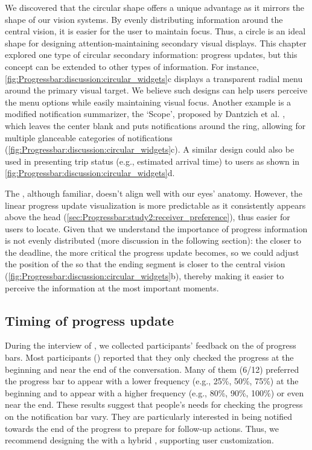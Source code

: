 We discovered that the circular shape offers a unique advantage as it mirrors the shape of our vision systems. By evenly distributing information around the central vision, it is easier for the user to maintain focus. Thus, a circle is an ideal shape for designing attention-maintaining secondary visual displays. This chapter explored one type of circular secondary information: progress updates, but this concept can be extended to other types of information. For instance, \autoref{fig:Progressbar:discussion:circular_widgets}c displays a transparent radial menu around the primary visual target. We believe such designs can help users perceive the menu options while easily maintaining visual focus. Another example is a modified notification summarizer, the `Scope', proposed by Dantzich et al. \cite{van_dantzich_scope_2002}, which leaves the center blank and puts notifications around the ring, allowing for multiple glanceable categories of notifications (\autoref{fig:Progressbar:discussion:circular_widgets}c). A similar design could also be used in presenting trip status (e.g., estimated arrival time) to users as shown in \autoref{fig:Progressbar:discussion:circular_widgets}d.

The \linearbar{}, although familiar, doesn't align well with our eyes' anatomy. However, the linear progress update visualization is more predictable as it consistently appears above the head (\autoref{sec:Progressbar:study2:receiver_preference}), thus easier for users to locate. Given that we understand the importance of progress information is not evenly distributed (more discussion in the following section): the closer to the deadline, the more critical the progress update becomes, so we could adjust the position of the \linearbar{} so that the ending segment is closer to the central vision (\autoref{fig:Progressbar:discussion:circular_widgets}b), thereby making it easier to perceive the information at the most important moments.

\subsection{Timing of progress update}

During the interview of \studytwo{}, we collected participants' feedback on the \intermittent{} \persistence{} of progress bars. Most participants () reported that they only checked the progress at the beginning and near the end of the conversation. Many of them (6/12) preferred the progress bar to appear  with a lower frequency (e.g., 25\%, 50\%, 75\%) at the beginning and to appear  with a higher frequency (e.g., 80\%, 90\%, 100\%) or even  near the end. These results suggest that people's needs for checking the progress on the notification bar vary. They are particularly interested in being notified towards the end of the progress to prepare for follow-up actions. Thus, we recommend designing the \circularbar{} with a hybrid \persistence{}, supporting user customization.

